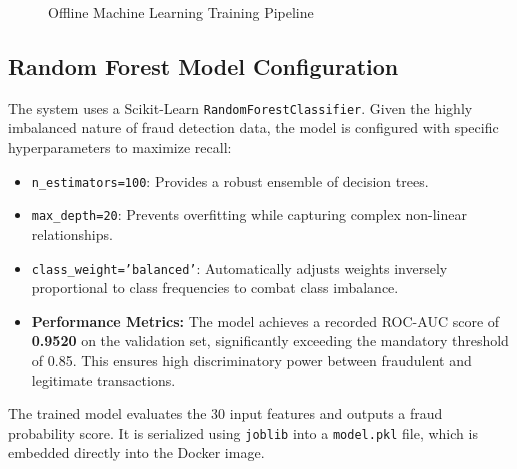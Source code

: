 \documentclass[12pt,a4paper]{article}
\begin{document}
\begin{figure}[H]
\centering
{}
\caption{Offline Machine Learning Training Pipeline}
\end{figure}

\subsection{Random Forest Model Configuration}
The system uses a Scikit-Learn \texttt{RandomForestClassifier}. Given the highly imbalanced nature of fraud detection data, the model is configured with specific hyperparameters to maximize recall:
\begin{itemize}
    \item \texttt{n\_estimators=100}: Provides a robust ensemble of decision trees.
    \item \texttt{max\_depth=20}: Prevents overfitting while capturing complex non-linear relationships.
    \item \texttt{class\_weight='balanced'}: Automatically adjusts weights inversely proportional to class frequencies to combat class imbalance.
    \item \textbf{Performance Metrics:} The model achieves a recorded ROC-AUC score of \textbf{0.9520} on the validation set, significantly exceeding the mandatory threshold of 0.85. This ensures high discriminatory power between fraudulent and legitimate transactions.
\end{itemize}
The trained model evaluates the 30 input features and outputs a fraud probability score. It is serialized using \texttt{joblib} into a \texttt{model.pkl} file, which is embedded directly into the Docker image.
\end{document}
